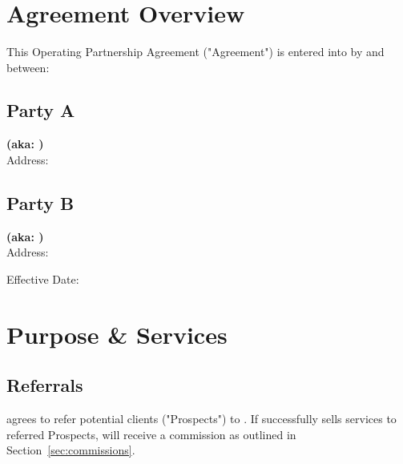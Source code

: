 \documentclass[12pt]{article}
\begin{document}
\thispagestyle{firstpage}

\begin{center}
{\Large\textbf{\partyA}\\
\partyAaddress}\\[2em]
\end{center}

\begin{center}
  {\Large\bfseries \agreementTitle}\\[0.5em]
\end{center}

\markboth{\agreementShortTitle}{\agreementShortTitle}


\section{Agreement Overview}
This Operating Partnership Agreement ("Agreement") is entered into by and between:

\subsection*{Party A}
\textbf{\partyA (aka: \partyAshort)}\\
Address: \textbf{\partyAaddress}

\subsection*{Party B}
\textbf{\partyB (aka: \partyBshort)}\\
Address: \textbf{\partyBaddress}

Effective Date: \textbf{\effectiveDate}

\newpage

\section{Purpose \& Services}
\subsection{Referrals}
\partyAshort{} agrees to refer potential clients ("Prospects") to \partyBshort{}.  
If \partyBshort{} successfully sells services to referred Prospects, \partyAshort{} will receive a commission as outlined in Section~\ref{sec:commissions}.
\end{document}
